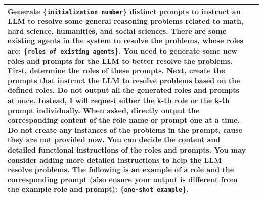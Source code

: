\begin{table}[h]
\begin{center}
\begin{tabular}{ m{1cm} | m{14cm}}
Generate \{\texttt{initialization number}\} distinct prompts to instruct an LLM to resolve some general reasoning problems related to math, hard science, humanities, and social sciences.  There are some existing agents in the system to resolve the problems, whose roles are: \{\texttt{roles of existing agents}\}. \newline
You need to generate some new roles and prompts for the LLM to better resolve the problems. \newline
First, determine the roles of these prompts. Next, create the prompts that instruct the LLM to resolve problems based on the defined roles.  \newline 
Do not output all the generated roles and prompts at once. Instead, I will request either the k-th role or the k-th prompt individually. When asked, directly output the corresponding content of the role name or prompt one at a time.  \newline
Do not create any instances of the problems in the prompt, cause they are not provided now.  \newline 
You can decide the content and detailed functional instructions of the roles and prompts. You may consider adding more detailed instructions to help the LLM resolve problems.  \newline
The following is an example of a role and the corresponding prompt (also ensure your output is different from the example role and prompt): \newline \newline
\{\texttt{one-shot example}\}.
 \\ 

\bottomrule
\end{tabular}
\end{center}
\end{table}

\clearpage




